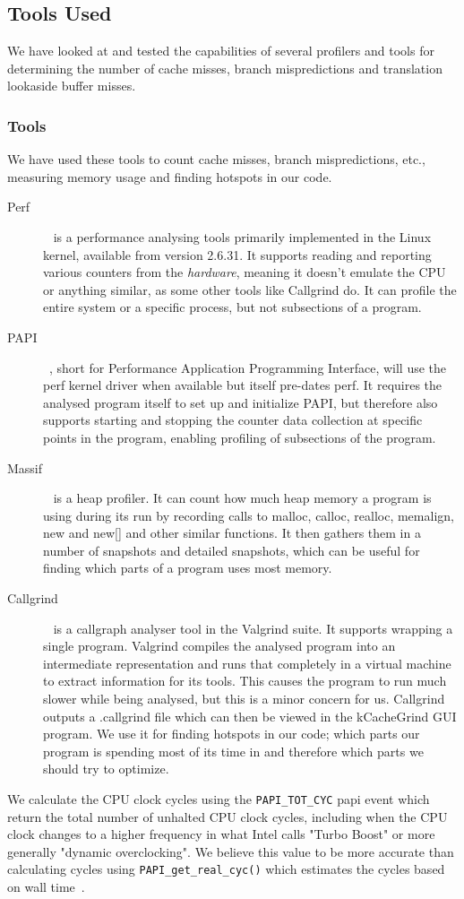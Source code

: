 \subsection{Tools Used}
We have looked at and tested the capabilities of several profilers and tools for determining the number of cache misses, branch mispredictions and translation lookaside buffer misses.


\subsubsection{Tools}
We have used these tools to count cache misses, branch mispredictions, etc., measuring memory usage and finding hotspots in our code.
\begin{description}
\item[Perf]~\citep{perftool} is a performance analysing tools primarily implemented in the Linux kernel, available from version 2.6.31.
It supports reading and reporting various counters from the \textit{hardware}, meaning it doesn't emulate the CPU or anything similar, as some other tools like Callgrind do.
It can profile the entire system or a specific process, but not subsections of a program.
\item[PAPI]~\citep{PAPI}, short for Performance Application Programming Interface, will use the perf kernel driver when available but itself pre-dates perf.
It requires the analysed program itself to set up and initialize PAPI, but therefore also supports starting and stopping the counter data collection at specific points in the program, enabling profiling of subsections of the program.
\item[Massif]~\citep{massif} is a heap profiler. It can count how much heap memory a program is using during its run by recording calls to malloc, calloc, realloc, memalign, new and new[] and other similar functions.
It then gathers them in a number of snapshots and detailed snapshots, which can be useful for finding which parts of a program uses most memory.
\item[Callgrind]~\citep{callgrind} is a callgraph analyser tool in the Valgrind suite.
It supports wrapping a single program.
Valgrind compiles the analysed program into an intermediate representation and runs that completely in a virtual machine to extract information for its tools.
This causes the program to run much slower while being analysed, but this is a minor concern for us.
Callgrind outputs a .callgrind file which can then be viewed in the kCacheGrind GUI program.
We use it for finding hotspots in our code; which parts our program is spending most of its time in and therefore which parts we should try to optimize.
\end{description}
We calculate the CPU clock cycles using the \texttt{PAPI\_TOT\_CYC} papi event which return the total number of unhalted CPU clock cycles, including when the CPU clock changes to a higher frequency in what Intel calls "Turbo Boost" or more generally "dynamic overclocking".
We believe this value to be more accurate than calculating cycles using \texttt{PAPI\_get\_real\_cyc()} which estimates the cycles based on wall time~\citep{PAPI-get-real-cyc}. 

